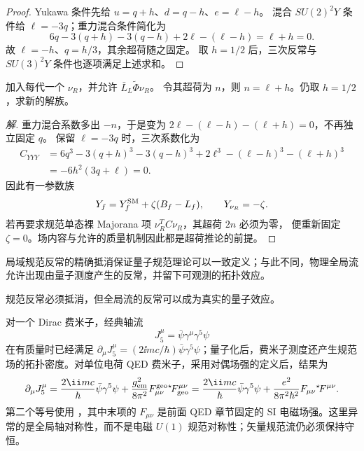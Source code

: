 \begin{proof}
Yukawa 条件先给 $u=q+h$、$d=q-h$、$e=\ell-h$。
混合 $SU(2)^2Y$ 条件给 $\ell=-3q$；重力混合条件简化为
\begin{equation*}
6q-3(q+h)-3(q-h)+2\ell-(\ell-h)=\ell+h=0.
\end{equation*}
故 $\ell=-h$、$q=h/3$，其余超荷随之固定。
取 $h=1/2$ 后，三次反常与 $SU(3)^2Y$ 条件也逐项满足上述求和。
\end{proof}

\begin{example}[加入右手中微子以后超荷约束怎样变化]
加入每代一个 $\nu_R$，并允许 $\bar L_L\widetilde\Phi\nu_R$。
令其超荷为 $n$，则 $n=\ell+h$。仍取 $h=1/2$，求新的解族。
\end{example}
\begin{proof}[解]
重力混合系数多出 $-n$，于是变为
$2\ell-(\ell-h)-(\ell+h)=0$，不再独立固定 $q$。
保留 $\ell=-3q$ 时，三次系数化为
\begin{align*}
C_{YYY}
&=6q^3-3(q+h)^3-3(q-h)^3
+2\ell^3-(\ell-h)^3-(\ell+h)^3\\
&=-6h^2(3q+\ell)=0.
\end{align*}
因此有一参数族
\begin{equation}
Y_f=Y_f^{\rm SM}+\zeta(B_f-L_f),\qquad Y_{\nu_R}=-\zeta.
\label{eq:sm-hypercharge-with-nur-family-dp126}
\end{equation}
若再要求规范单态裸 Majorana 项 $\nu_R^TC\nu_R$，其超荷 $2n$ 必须为零，
便重新固定 $\zeta=0$。场内容与允许的质量机制因此都是超荷推论的前提。
\end{proof}

\label{subsec:sm-global-axial-anomaly-dp32}
局域规范反常的精确抵消保证量子规范理论可以一致定义；与此不同，物理全局流允许出现由量子测度产生的反常，并留下可观测的拓扑效应。

规范反常必须抵消，但全局流的反常可以成为真实的量子效应。\begin{proposition}[轴流反常与电磁 SI 场强]
对一个 Dirac 费米子，经典轴流
\begin{equation*}
 J_5^\mu=\bar\psi\gamma^\mu\gamma^5\psi
\end{equation*}
在有质量时已经满足 $\partial_\mu J_5^\mu=(2\ii mc/\hbar)\bar\psi\gamma^5\psi$；量子化后，费米子测度还产生规范场的拓扑密度。对单位电荷 QED 费米子，采用对偶场强的定义后，结果为
\begin{equation}
 {
 \partial_\mu J_5^\mu
 =\frac{2\ii mc}{\hbar}\bar\psi\gamma^5\psi
 +\frac{g_{\rm em}^2}{8\pi^2}
 F_{\mu\nu}^{\rm geo}{}^\star\!F_{\rm geo}^{\mu\nu}
 =\frac{2\ii mc}{\hbar}\bar\psi\gamma^5\psi
 +\frac{e^2}{8\pi^2\hbar^2}
 F_{\mu\nu}{}^\star\!F^{\mu\nu}.}
 \label{eq:abj-anomaly-qed-dp11}
\end{equation}
第二个等号使用 ，其中末项的 $F_{\mu\nu}$ 是前面 QED 章节固定的 SI 电磁场强。这里异常的是全局轴对称性，而不是电磁 $U(1)$ 规范对称性；矢量规范流仍必须保持守恒。
\end{proposition}

